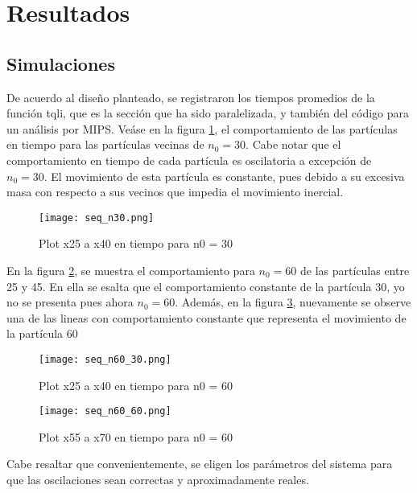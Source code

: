 \section{Resultados}

\subsection{Simulaciones}
De acuerdo al diseño planteado, se registraron los tiempos promedios de la función tqli, que es la sección que ha sido paralelizada, y también del código para un análisis por MIPS. Veáse en la figura \ref{fig:seq_n30}, el comportamiento de las partículas en tiempo para las partículas vecinas de $n_0 = 30$. Cabe notar que el comportamiento en tiempo de cada partícula es oscilatoria a excepción de $n_0 = 30$. El movimiento de esta partícula es constante, pues debido a su excesiva masa con respecto a sus vecinos que impedia el movimiento inercial.

\begin{figure}[h]
	\centering
	\texttt{[image: seq\_n30.png]}
	\caption{Plot x25 a x40 en tiempo para n0 = 30} 
	\label{fig:seq_n30}
\end{figure}

En la figura \ref{fig:seq_n60_30}, se muestra el comportamiento para $n_0 = 60$ de las partículas entre 25 y 45. En ella se esalta que el comportamiento constante de la partícula $30$, yo no se presenta pues ahora $n_0 = 60$. Además, en la figura \ref{fig:seq_n60_60}, nuevamente se observe una de las lineas con comportamiento constante que representa el movimiento de la partícula $60$

\begin{figure}[h]
	\centering
	\texttt{[image: seq\_n60\_30.png]}
	\caption{Plot x25 a x40 en tiempo para n0 = 60}
	\label{fig:seq_n60_30}
\end{figure}

\begin{figure}[h]
	\centering
	\texttt{[image: seq\_n60\_60.png]}
	\caption{Plot x55 a x70 en tiempo para n0 = 60}
	\label{fig:seq_n60_60}
\end{figure}

Cabe resaltar que convenientemente, se eligen los parámetros del sistema para que las oscilaciones sean correctas y aproximadamente reales.

